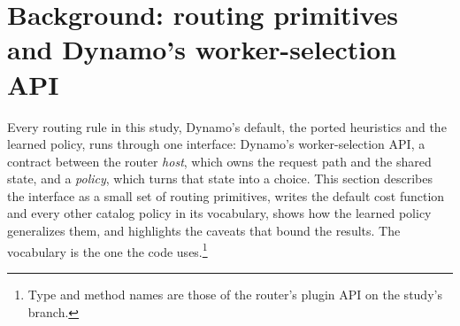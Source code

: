 %

\section{Background: routing primitives and Dynamo's worker-selection API}
\label{sec:background}

Every routing rule in this study, Dynamo's default, the ported heuristics and the learned policy,
runs through one interface: Dynamo's worker-selection API, a contract between the router
\emph{host}, which owns the request path and the shared state, and a \emph{policy}, which turns that
state into a choice. This section describes the interface as a small set of routing primitives,
writes the default cost function and every other catalog policy in its vocabulary, shows how the
learned policy generalizes them, and highlights the caveats that bound the results. The vocabulary
is the one the code uses.\footnote{Type and method names are those of the router's plugin API on
  the study's branch.}

